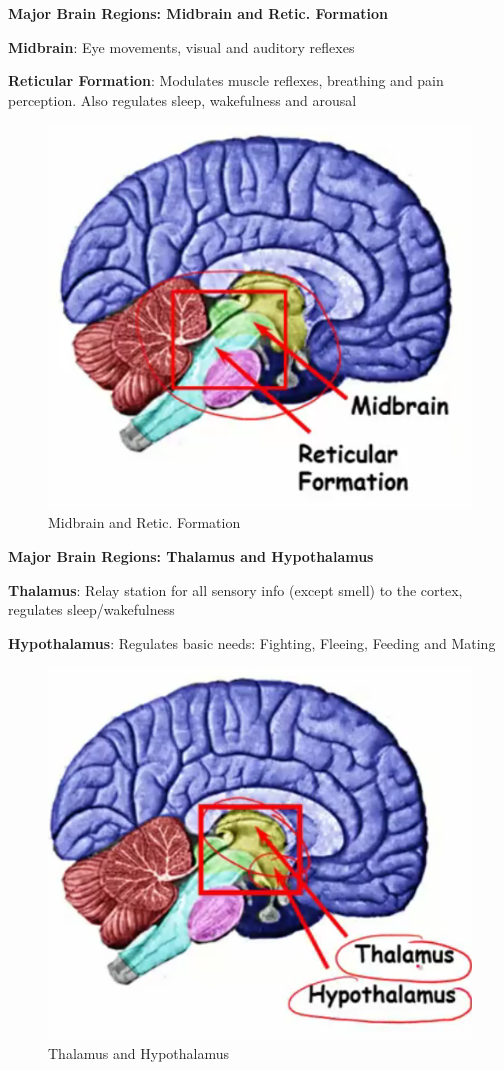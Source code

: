 \documentclass{book}
\begin{document}
\textbf{Major Brain Regions: Midbrain and Retic. Formation}

\textbf{Midbrain}: Eye movements, visual and auditory reflexes

\textbf{Reticular Formation}: Modulates muscle reflexes, breathing and pain perception. Also regulates sleep, wakefulness and arousal

\begin{figure}[h]
\centering
\includegraphics[width=0.7\linewidth]{./figures/midbrain}
\caption{Midbrain and Retic. Formation}
\label{fig:midbrain}
\end{figure}

\textbf{Major Brain Regions: Thalamus and Hypothalamus}

\textbf{Thalamus}: Relay station for all sensory info (except smell) to the cortex, regulates sleep/wakefulness

\textbf{Hypothalamus}: Regulates basic needs: Fighting, Fleeing, Feeding and Mating

\begin{figure}[h]
\centering
\includegraphics[width=0.7\linewidth]{./figures/Thalamus}
\caption{Thalamus and Hypothalamus}
\label{fig:Thalamus}
\end{figure}
\end{document}

